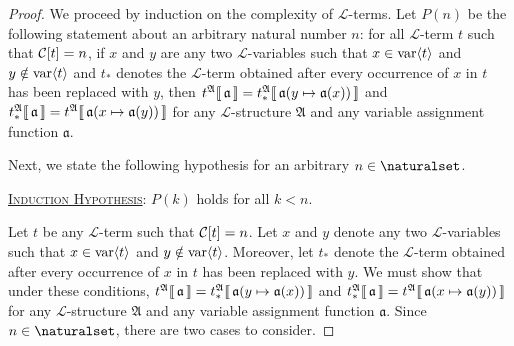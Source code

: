 \begin{proof}
    We proceed by induction on the complexity of \( \mathcal{L} \)-terms. Let \( P(n) \) be the following statement about an arbitrary natural number \( n \):
    for all \( \mathcal{L} \)-term \( t \) such that \( \folcomplexityofterm{t} = n \), if \( x \) and \( y \) are any two \( \mathcal{L} \)-variables such that
    \( x \in \operatorname{var} \langle t\rangle \) and \( y \notin \operatorname{var} \langle t\rangle \) and \( t_{\ast} \) denotes the \( \mathcal{L} \)-term obtained after every occurrence of \( x \)
    in \( t \) has been replaced with \( y \),
    then \( \folterminterpretation{t}{\mathfrak{A}}{\mathfrak{a}} = \folterminterpretation{t_{\ast}}{\mathfrak{A}}{ \folmodifiedvariableassignmentfunction{\mathfrak{a}}{y}{\mathfrak{a}(x)} } \) and
    \( \folterminterpretation{t_{\ast}}{\mathfrak{A}}{\mathfrak{a}} = \folterminterpretation{t}{\mathfrak{A}}{ \folmodifiedvariableassignmentfunction{\mathfrak{a}}{x}{\mathfrak{a}(y)} } \) for any \( \mathcal{L} \)-structure \( \mathfrak{A} \) and any variable assignment function \( \mathfrak{a} \).

    \vspace{0.3cm}
    \noindent
    Next, we state the following hypothesis for an arbitrary \( n \in \naturalset \).

    \vspace{0.3cm}
    \noindent
    \underline{\scshape Induction Hypothesis}: \( P(k) \) holds for all \( k < n \).

    \vspace{0.3cm}
    \noindent
    Let \( t \) be any \( \mathcal{L} \)-term such that \( \folcomplexityofterm{t} = n \).
    Let \( x \) and \( y \) denote any two \( \mathcal{L} \)-variables such that \( x \in \operatorname{var} \langle t\rangle \)
    and \( y \notin \operatorname{var} \langle t\rangle \). Moreover, let \( t_{\ast} \) denote the \( \mathcal{L} \)-term obtained
    after every occurrence of \( x \) in \( t \) has been replaced with \( y \).
    We must show that under these conditions, \( \folterminterpretation{t}{\mathfrak{A}}{\mathfrak{a}} = \folterminterpretation{t_{\ast}}{\mathfrak{A}}{ \folmodifiedvariableassignmentfunction{\mathfrak{a}}{y}{\mathfrak{a}(x)} } \) and \( \folterminterpretation{t_{\ast}}{\mathfrak{A}}{\mathfrak{a}} = \folterminterpretation{t}{\mathfrak{A}}{ \folmodifiedvariableassignmentfunction{\mathfrak{a}}{x}{\mathfrak{a}(y)} } \)
    for any \( \mathcal{L} \)-structure \( \mathfrak{A} \) and any variable assignment function \( \mathfrak{a} \).
    Since \( n \in \naturalset \), there are two cases to consider.


\end{proof}
